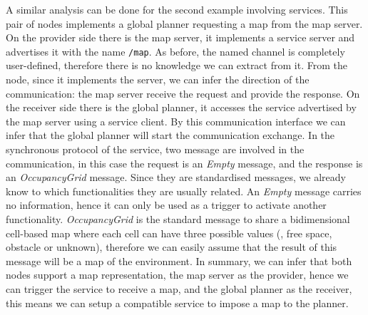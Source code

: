 A similar analysis can be done for the second example involving services. This pair of nodes implements a global planner requesting a map from the map server. On the provider side there is the map server, it implements a service server and advertises it with the name \texttt{/map}. As before, the named channel is completely user-defined, therefore there is no knowledge we can extract from it. From the node, since it implements the server, we can infer the direction of the communication: the map server receive the request and provide the response. On the receiver side there is the global planner, it accesses the service advertised by the map server using a service client. By this communication interface we can infer that the global planner will start the communication exchange. In the synchronous protocol of the service, two message are involved in the communication, in this case the request is an \textit{Empty} message, and the response is an \textit{OccupancyGrid} message. Since they are standardised messages, we already know to which functionalities they are usually related. An \textit{Empty} message carries no information, hence it can only be used as a trigger to activate another functionality. \textit{OccupancyGrid} is the standard message to share a bidimensional cell-based map where each cell can have three possible values (\ie, free space, obstacle or unknown), therefore we can easily assume that the result of this message will be a map of the environment. In summary, we can infer that both nodes support a map representation, the map server as the provider, hence we can trigger the service to receive a map, and the global planner as the receiver, this means we can setup a compatible service to impose a map to the planner.

